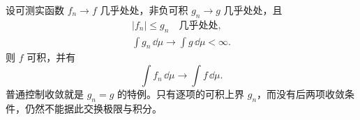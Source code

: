 设可测实函数 $f_n\to f$ 几乎处处，非负可积 $g_n\to g$ 几乎处处，且
\[
\begin{gathered}
|f_n|\le g_n\quad\text{几乎处处},\\
\int g_n\,\dd\mu\longrightarrow\int g\,\dd\mu<\infty.
\end{gathered}
\]
则 $f$ 可积，并有
\[
\int f_n\,\dd\mu\longrightarrow\int f\,\dd\mu.
\]
普通控制收敛就是 $g_n=g$ 的特例。只有逐项的可积上界 $g_n$，而没有后两项收敛条件，仍然不能据此交换极限与积分。

